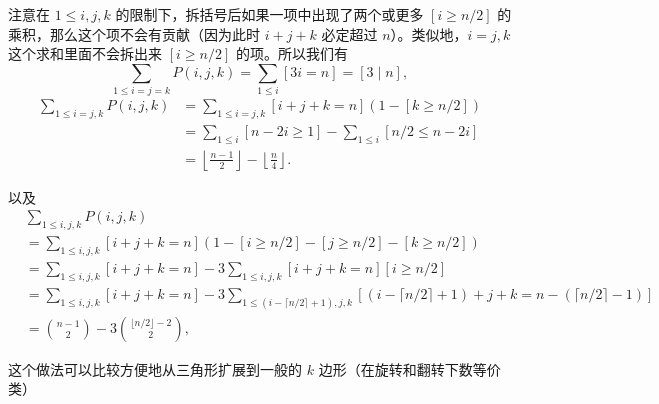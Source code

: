 \begin{frame}
    注意在 $1\le i,j,k$ 的限制下，拆括号后如果一项中出现了两个或更多 $[i\ge n/2]$ 的乘积，那么这个项不会有贡献（因为此时 $i+j+k$ 必定超过 $n$）。类似地，$i=j,k$ 这个求和里面不会拆出来 $[i\ge n/2]$ 的项。所以我们有
    $$
    \sum_{1\le i=j=k}P(i,j,k)=\sum_{1\le i}[3i=n]=[3\mid n],
    $$
    $$
    \begin{aligned}
    \sum_{1\le i=j,k}P(i,j,k)&=\sum_{1\le i=j,k}[i+j+k=n](1-[k\ge n/2])\\
    &=\sum_{1\le i}[n-2i\ge 1]-\sum_{1\le i}[n/2\le n-2i]\\
    &=\left\lfloor\frac{n-1}{2}\right\rfloor-\left\lfloor\frac{n}{4}\right\rfloor.
    \end{aligned}
    $$
\end{frame}
\begin{frame}
    以及
    $$
    \begin{aligned}
    &\sum_{1\le i,j,k}P(i,j,k)\\
    &=\sum_{1\le i,j,k}[i+j+k=n](1-[i\ge n/2]-[j\ge n/2]-[k\ge n/2])\\
    &=\sum_{1\le i,j,k}[i+j+k=n]-3\sum_{1\le i,j,k}[i+j+k=n][i\ge n/2]\\
    &=\sum_{1\le i,j,k}[i+j+k=n]-3\sum_{1\le (i-\lceil n/2\rceil+1),j,k}[(i-\lceil n/2\rceil+1)+j+k=n-(\lceil n/2\rceil-1)]\\
    &=\binom{n-1}{2}-3\binom{\lfloor n/2\rfloor-2}{2},
    \end{aligned}
    $$

    这个做法可以比较方便地从三角形扩展到一般的 $k$ 边形（在旋转和翻转下数等价类）
\end{frame}
